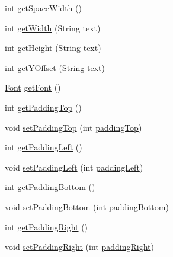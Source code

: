 \begin{DoxyCompactItemize}
\item 
int \mbox{\hyperlink{classorg_1_1newdawn_1_1slick_1_1_unicode_font_ae22ad15476d281ba64344fa67da926f1}{get\+Space\+Width}} ()
\item 
int \mbox{\hyperlink{classorg_1_1newdawn_1_1slick_1_1_unicode_font_a5a1aa518193d31f1407d3cb5e5997ca8}{get\+Width}} (String text)
\item 
int \mbox{\hyperlink{classorg_1_1newdawn_1_1slick_1_1_unicode_font_a409f20ee363890da63571bbc46567808}{get\+Height}} (String text)
\item 
int \mbox{\hyperlink{classorg_1_1newdawn_1_1slick_1_1_unicode_font_ad81c1a98a29d8292ebb4b74f771789b5}{get\+Y\+Offset}} (String text)
\item 
\mbox{\hyperlink{interfaceorg_1_1newdawn_1_1slick_1_1_font}{Font}} \mbox{\hyperlink{classorg_1_1newdawn_1_1slick_1_1_unicode_font_a79b0d204d4dc075991bd0a3625722521}{get\+Font}} ()
\item 
int \mbox{\hyperlink{classorg_1_1newdawn_1_1slick_1_1_unicode_font_a77eb496db108ecac650dd6b17792cd7a}{get\+Padding\+Top}} ()
\item 
void \mbox{\hyperlink{classorg_1_1newdawn_1_1slick_1_1_unicode_font_afae348ec73cbc25c919dc92c8d65784d}{set\+Padding\+Top}} (int \mbox{\hyperlink{classorg_1_1newdawn_1_1slick_1_1_unicode_font_acadcc8c595615d077e2c0039818292f2}{padding\+Top}})
\item 
int \mbox{\hyperlink{classorg_1_1newdawn_1_1slick_1_1_unicode_font_ae7524dd1bc030351f6a739206e97413a}{get\+Padding\+Left}} ()
\item 
void \mbox{\hyperlink{classorg_1_1newdawn_1_1slick_1_1_unicode_font_a0ec91919e6999efd6ac061d3d8531c1e}{set\+Padding\+Left}} (int \mbox{\hyperlink{classorg_1_1newdawn_1_1slick_1_1_unicode_font_a2c0919e4c3c800093767e29827064b0e}{padding\+Left}})
\item 
int \mbox{\hyperlink{classorg_1_1newdawn_1_1slick_1_1_unicode_font_a219e5cb9fec3686abec0906668a89b6c}{get\+Padding\+Bottom}} ()
\item 
void \mbox{\hyperlink{classorg_1_1newdawn_1_1slick_1_1_unicode_font_aac0bf22d918803bfd351a6b06aac7f5e}{set\+Padding\+Bottom}} (int \mbox{\hyperlink{classorg_1_1newdawn_1_1slick_1_1_unicode_font_a101f8814305c63cba7b7bbb7d1bf87ae}{padding\+Bottom}})
\item 
int \mbox{\hyperlink{classorg_1_1newdawn_1_1slick_1_1_unicode_font_abacb07d8c4dd9a0c977ea5cbc34de6a7}{get\+Padding\+Right}} ()
\item 
void \mbox{\hyperlink{classorg_1_1newdawn_1_1slick_1_1_unicode_font_ae2a1a2e1a175ea26c748a41efa3578a5}{set\+Padding\+Right}} (int \mbox{\hyperlink{classorg_1_1newdawn_1_1slick_1_1_unicode_font_ac488d6ccaeeb1d846fb5fc796a4e4ff2}{padding\+Right}})

\end{DoxyCompactItemize}
